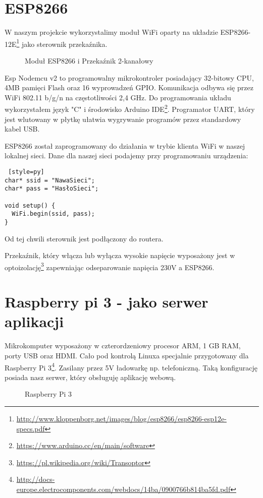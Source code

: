 \documentclass{xmgr}
\begin{document}
\section{ESP8266}
W naszym projekcie wykorzystalimy moduł WiFi oparty na układzie ESP8266-12E\footnote{\url{http://www.kloppenborg.net/images/blog/esp8266/esp8266-esp12e-specs.pdf}} jako sterownik przekaźnika. 
\hspace{2cm}
\begin{figure}[h]
\centering
{}
\quad
{}
\quad
\caption{Moduł ESP8266 i Przekaźnik 2-kanałowy}
\end{figure}

Esp Nodemcu v2 to programowalny mikrokontroler posiadający 32-bitowy CPU, 4MB pamięci Flash oraz 16 wyprowadzeń GPIO. Komunikacja odbywa się przez WiFi 802.11 b/g/n na częstotliwości 2,4 GHz. Do programowania układu wykorzystałem język "C" i środowisko Arduino IDE\footnote{\url{https://www.arduino.cc/en/main/software}}. Programator UART, który jest wlutowany w płytkę ułatwia wygrywanie programów przez standardowy kabel USB. 

ESP8266 został zaprogramowany do działania w trybie klienta WiFi w naszej lokalnej sieci. Dane dla naszej sieci podajemy przy programowaniu urządzenia:
\begin{lstlisting} [style=py] 
char* ssid = "NawaSieci";
char* pass = "HasłoSieci";

void setup() {
  WiFi.begin(ssid, pass);
}
\end{lstlisting}
Od tej chwili sterownik jest podłączony do routera.

Przekaźnik, który włącza lub wyłącza wysokie napięcie wyposażony jest w optoizolację\footnote{\url{https://pl.wikipedia.org/wiki/Transoptor}} zapewniając odseparowanie napięcia 230V a ESP8266. 

\section{Raspberry pi 3 - jako serwer aplikacji}
Mikrokomputer wyposażony w czterordzeniowy procesor ARM, 1 GB RAM, porty USB oraz HDMI. Cało pod kontrolą Linuxa specjalnie przygotowany dla Raspberry Pi 3\footnote{\url{http://docs-europe.electrocomponents.com/webdocs/14ba/0900766b814ba5fd.pdf}}. Zasilany przez 5V ładowarkę np. telefoniczną. Taką konfigurację posiada nasz serwer, który obsługuję  aplikację webową.
\hspace{2cm}
\begin{figure}[h]
\centering
{}
\quad
\caption{Raspberry Pi 3}
\end{figure}
\end{document}
